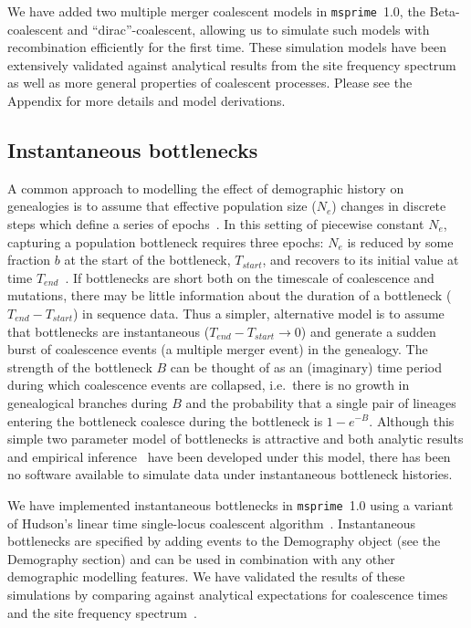 \documentclass{article}
\newcommand{\msprime}[0]{\texttt{msprime}}
\begin{document}
We have added two multiple merger coalescent models in \msprime\ 1.0, the
Beta-coalescent and ``dirac''-coalescent, allowing us to simulate
such models with recombination efficiently for the first time.
These simulation models have been extensively validated against
analytical results from the site frequency
spectrum~\citep{birkner2013statistical,blath2016site,hobolth2019phase}
 as well as more general properties of coalescent processes.
Please see the Appendix for more details and model derivations.

\subsection*{Instantaneous bottlenecks}

A common approach to modelling the effect of demographic history on genealogies
is to assume that effective population size ($N_e$) changes in discrete steps
which define a series of epochs~\citep{griffiths1994sampling, marth2004allele,
keightley2007joint,li2011inference}. In this setting of piecewise constant
$N_e$, capturing a population bottleneck requires three epochs: $N_e$ is
reduced by some fraction $b$ at the start of the bottleneck, $T_{start}$, and
recovers to its initial value at time $T_{end}$~\citep{marth2004allele}. If
bottlenecks are short both on the timescale of coalescence and mutations,
there may be little information about the duration of a bottleneck
($T_{end}-T_{start}$) in sequence data. Thus a simpler, alternative model is to
assume that bottlenecks are instantaneous ($T_{end}-T_{start} \rightarrow 0$)
and generate a sudden burst of coalescence events (a multiple merger event) in
the genealogy. The strength of the bottleneck $B$ can be thought of as an
(imaginary) time period during which coalescence events are collapsed,
i.e.\ there is no growth in genealogical branches during $B$ and the probability that a
single pair of lineages entering the bottleneck coalesce during the bottleneck
is $1-e^{-B}$. Although this simple two parameter model of bottlenecks is
attractive and both analytic results and empirical
inference~\citep{griffiths1994sampling, galtier2000detecting,
bunnefeld2015inferring} have been developed under this model, there has
been no software available to simulate data under instantaneous
bottleneck histories.

We have implemented instantaneous bottlenecks in \msprime~1.0
using a variant of Hudson's linear time single-locus coalescent
algorithm~\citep{hudson1990gene}. Instantaneous bottlenecks are specified
by adding events to the Demography object (see the Demography section)
and can be used in combination with any other demographic modelling
features. We have validated the results of these simulations by comparing
against analytical expectations for coalescence times and the
site frequency spectrum~\citep{bunnefeld2015inferring}.
\end{document}
